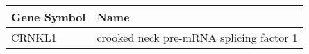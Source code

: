 \begin{tabular}{ll}
\toprule
Gene Symbol &                                    Name \\
\midrule
     CRNKL1 & crooked neck pre-mRNA splicing factor 1 \\
\bottomrule
\end{tabular}
